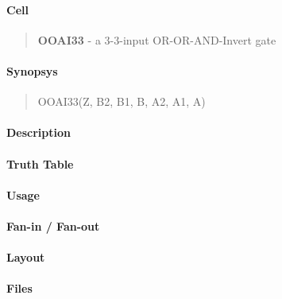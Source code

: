 \label{OOAI33}
\paragraph{Cell}
\begin{quote}
    \textbf{OOAI33} - a 3-3-input OR-OR-AND-Invert gate
\end{quote}

\paragraph{Synopsys}
\begin{quote}
    OOAI33(Z, B2, B1, B, A2, A1, A)
\end{quote}

\paragraph{Description}



\paragraph{Truth Table}


\paragraph{Usage}

\paragraph{Fan-in / Fan-out}

\paragraph{Layout}

\paragraph{Files}
